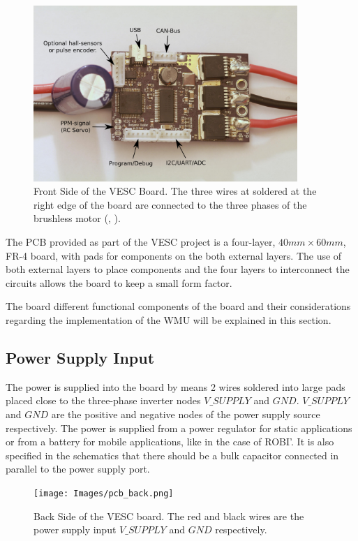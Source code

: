 \begin{figure}[htbp]
\centering
\includegraphics[width=10cm]{Images/pcb_front.png} 
\caption[VESC Front Side]{Front Side of the VESC Board. The three wires at soldered at the right edge of the board are connected to the three phases of the brushless motor  (\citeauthor{VedderVesc}, \citeyear{VedderVesc}).}
\label{fig:pcb_front}
\end{figure}

The \ac{PCB} provided as part of the VESC project is a four-layer, $40mm \times 60mm$, FR-4 board, with pads for components on the both external layers. The use of both external layers to place components and the four layers to interconnect the circuits allows the board to keep a small form factor.

The board different functional components of the board and their considerations regarding the implementation of the \ac{WMU} will be explained in this section.

\subsection{Power Supply Input}
The power is supplied into the board by means 2 wires soldered into large pads placed close to the three-phase inverter nodes $V\_SUPPLY$ and $GND$. $V\_SUPPLY$ and $GND$ are the positive and negative nodes of the power supply source respectively. The power is supplied from a power regulator for static applications or from a battery for mobile applications, like in the case of ROBI'. It is also specified in the schematics that there should be a bulk capacitor connected in parallel to the power supply port.

\begin{figure}[htbp]
\centering
\texttt{[image: Images/pcb\_back.png]} 
\caption[VESC Back Side]{Back Side of the VESC board. The red and black wires are the power supply input $V\_SUPPLY$ and $GND$ respectively.}
\label{fig:pcb_back}
\end{figure}


